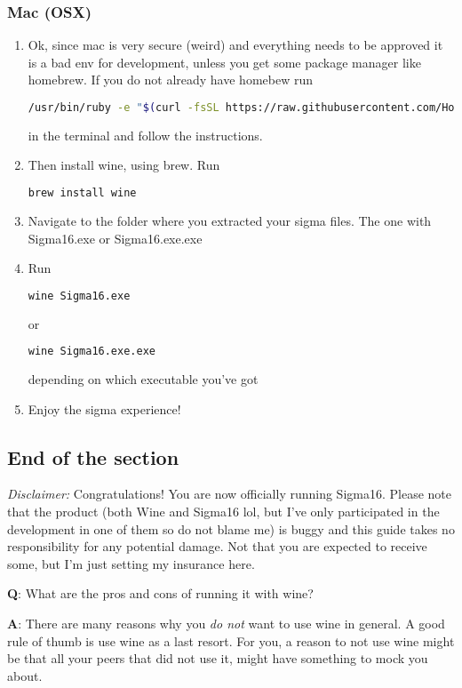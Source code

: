 \documentclass[11pt,a4paper]{article}
\begin{document}
 \subsubsection{Mac (OSX)}
 \begin{enumerate}[start=0]
   \item Ok, since mac is very secure (weird) and everything needs to be approved it is a bad env for development, unless you get some package manager like homebrew. If you do not already have homebew run

\begin{lstlisting}[language=Bash,breaklines]
/usr/bin/ruby -e "$(curl -fsSL https://raw.githubusercontent.com/Homebrew/install/master/install)"
\end{lstlisting}

   in the terminal and follow the instructions.
   \item Then install wine, using brew. Run
\begin{lstlisting}[language=Bash]
brew install wine
\end{lstlisting}
   \item Navigate to the folder where you extracted your sigma files. The one with Sigma16.exe or Sigma16.exe.exe
   \item Run 
\begin{lstlisting}[language=Bash]
wine Sigma16.exe
\end{lstlisting}
    or 
\begin{lstlisting}[language=Bash]
wine Sigma16.exe.exe
\end{lstlisting}
depending on which executable you've got
   \item Enjoy the sigma experience!
\end{enumerate}

\subsection{End of the section}
 \textit{Disclaimer:}
 Congratulations! You are now officially running Sigma16. Please note that the product (both Wine and Sigma16 lol, but I've only participated in the development in one of them so do not blame me) is buggy and this guide takes no responsibility for any potential damage. Not that you are expected to receive some, but I'm just setting my insurance here.

\textbf{Q}: What are the pros and cons of running it with wine?

\textbf{A}: There are many reasons why you \textit{do not} want to use wine in general. A good rule of thumb is use wine as a last resort. For you, a reason to not use wine might be that all your peers that did not use it, might have something to mock you about.
\end{document}
